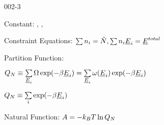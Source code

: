 \begin{mitframe}{002-3} %

    
\begin{listone}
    
    \item Constant: \nummoles, \uline{\vol}, \Temp
    
    \item Constraint Equations: $\sum\nolimits \molspecies{i} = \totmoles, \sum\nolimits \molspecies{i}\uline{\energy}_{i} = \uline{\energy}^{total}  $     
    
    \item Partition Function:
    
    \begin{listtwo}
    
    	\item $\cpf \equiv \sum\limits_{\uline{\energy}_{i}} \mpc\exp(-\boltznorm\uline{\energy}_{i}) = \sum\limits_{\uline{\energy}_{i}} \mpf(\uline{\energy}_{i})\exp(-\boltznorm\uline{\energy}_{i}) $
    
    	\item $\cpf \equiv \sum\limits_{i} \exp(-\boltznorm\uline{\energy}_{i}) $
           
    \end{listtwo}
           
    \item Natural Function: $\helmholtz = -\boltz\Temp\ln\cpf$
    
    
    
\end{listone}
    
\end{mitframe}